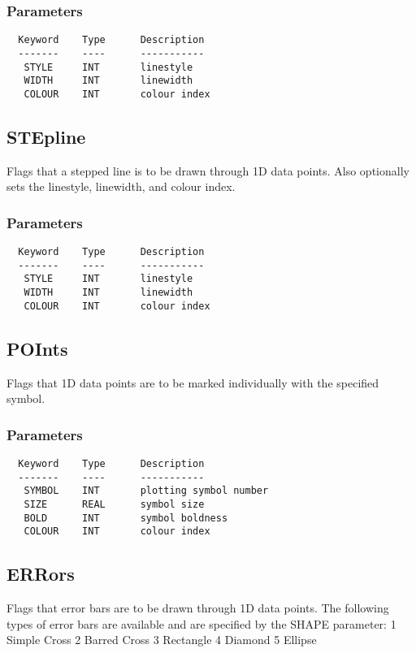 \documentclass{book}
\renewcommand{\_}{{\tt\char'137}}     %
\begin{document}
\subsubsection{Parameters}
\begin{verbatim}
  Keyword    Type      Description
  -------    ----      -----------
   STYLE     INT       linestyle
   WIDTH     INT       linewidth
   COLOUR    INT       colour index
\end{verbatim}\subsection{STEpline}
Flags that a stepped line is to be drawn through 1D data points.
Also optionally sets the linestyle, linewidth, and
colour index.
 
\subsubsection{Parameters}
\begin{verbatim}
  Keyword    Type      Description
  -------    ----      -----------
   STYLE     INT       linestyle
   WIDTH     INT       linewidth
   COLOUR    INT       colour index
\end{verbatim}\subsection{POInts}
Flags that 1D data points are to be marked individually
with the specified symbol.
\subsubsection{Parameters}
\begin{verbatim}
  Keyword    Type      Description
  -------    ----      -----------
   SYMBOL    INT       plotting symbol number
   SIZE      REAL      symbol size
   BOLD      INT       symbol boldness
   COLOUR    INT       colour index
\end{verbatim}\subsection{ERRors}
Flags that error bars are to be drawn through 1D data points.
The following types of error bars are available and are
specified by the SHAPE parameter:
1 Simple Cross 2 Barred Cross
3 Rectangle 4 Diamond
5 Ellipse
\end{document}
